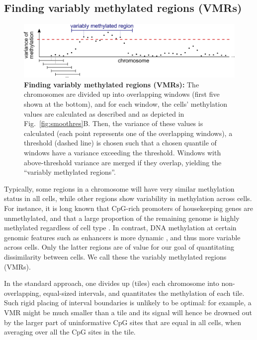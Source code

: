 \documentclass[twocolumn,10pt]{article}
\begin{document}
\subsection{Finding variably methylated regions (VMRs)}

\begin{figure}
    \includegraphics[width=\columnwidth]{figures/Fig_sliding.png}
    \caption{\small \textbf{Finding variably methylated regions (VMRs):} The chromosomes are divided up into overlapping windows (first five shown at the bottom), and for each window, the cells' methylation values are calculated as described and as depicted in Fig.~\ref{fig:smoothres}B.
Then, the variance of these values is calculated (each point represents one of the overlapping windows), a threshold (dashed line) is chosen such that a chosen quantile of windows have a variance exceeding the threshold.
Windows with above-threshold variance are merged if they overlap, yielding the ``variably methylated regions''.}
    \label{fig:vmr}
\end{figure}


Typically, some regions in a chromosome will have very similar methylation status in all cells, while other regions show variability in methylation across cells.
For instance, it is long known that CpG-rich promoters of housekeeping genes are unmethylated, and that a large proportion of the remaining genome is highly methylated regardless of cell type \citep{bird1986cpg}.
In contrast, DNA methylation at certain genomic features such as enhancers is more dynamic \citep{argelaguet2019gastru}, and thus more variable across cells.
Only the latter regions are of value for our goal of quantitating dissimilarity between cells.
We call these the variably methylated regions (VMRs). %

In the standard approach, one divides up (tiles) each chromosome into non-overlapping, equal-sized intervals, and quantitates the methylation of each tile.
Such rigid placing of interval boundaries is unlikely to be optimal: for example, a VMR might be much smaller than a tile and its signal will hence be drowned out by the larger part of uninformative CpG sites that are equal in all cells, when averaging over all the CpG sites in the tile.
\end{document}
